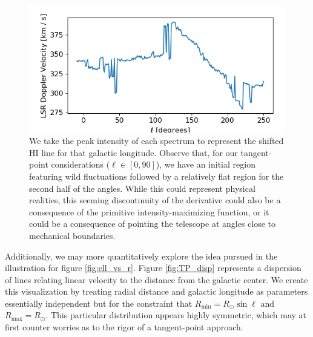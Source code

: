\documentclass[12pt]{article}
\begin{document}
\begin{figure}
	\centering
	\includegraphics[width=.8\linewidth]{Doppler_collection}
	\caption{We take the peak intensity of each spectrum to represent the shifted HI line for that galactic longitude.  Observe that, for our tangent-point considerations ($\ell \in [0, 90]$), we have an initial region featuring wild fluctuations followed by a relatively flat region for the second half of the angles. While this could represent physical realities, this seeming discontinuity of the derivative could also be a consequence of the primitive intensity-maximizing function, or it could be a consequence of pointing the telescope at angles close to mechanical boundaries.}
	\label{fig:Dopp_collection}
\end{figure}


Additionally, we may more quantitatively explore the idea pursued in the illustration for figure \ref{fig:ell_vs_r}. Figure \ref{fig:TP_disp} represents a dispersion of lines relating linear velocity to the distance from the galactic center. We create this visualization by treating radial distance and galactic longitude as parameters essentially independent but for the constraint that $R_\text{min} = R_\odot \sin \ell$ and $R_\text{max} = R_\odot$. This particular distribution appears highly symmetric, which may at first counter worries as to the rigor of a tangent-point approach.
\end{document}
